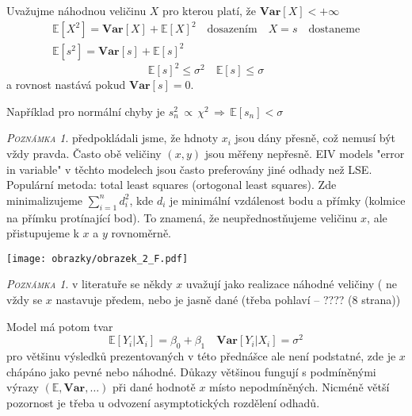 \documentclass[oneside,intlimits,reqno]{scrbook}
\theoremstyle{definition}
\theoremstyle{plain}
\theoremstyle{remark}
\newtheorem{remark}[define]{\textsc{Poznámka}}
\begin{document}
Uvažujme náhodnou veličinu $ X $  pro kterou platí, že $ \textbf{Var} [ X ] < + \infty $
\begin{equation*}
\begin{aligned}
 \mathbb{E}[X^{2}] = \textbf{Var} [ X ] +  \mathbb{E}[X]^{2} \quad \text{dosazením} \quad X = s \quad \text{dostaneme} \\
  \mathbb{E}[s^{2}] = \textbf{Var} [ s ] +  \mathbb{E}[s]^{2}
 \end{aligned} 
\end{equation*}
\begin{equation}
\mathbb{E}[s]^{2} \leq \sigma^{2} \quad \mathbb{E}[s] \leq \sigma
\end{equation}
a rovnost nastává pokud $ \textbf{Var} [ s ] = 0 $.

Například pro normální chyby je $ s_{n}^{2} \, \propto \, \chi^{2} \, \Rightarrow \, \mathbb{E} [s_{n}] < \sigma $

\begin{remark}
	předpokládali jsme, že hdnoty $ x_{i} $ jsou dány přesně, což nemusí být vždy pravda. Často obě veličiny $ (x,y) $ jsou měřeny nepřesně. EIV models "error in variable" v těchto modelech jsou často preferovány jiné odhady než LSE. Populární metoda: total least squares (ortogonal least squares). Zde minimalizujeme $ \sum_{i=1}^{n} d_{i}^{2} $, kde $ d_{i} $ je minimální vzdálenost bodu a přímky (kolmice na přímku protínající bod). To znamená, že neupřednostňujeme veličinu $ x $, ale přistupujeme k $ x $ a $ y $ rovnoměrně.
\end{remark}
\begin{center}
    \texttt{[image: obrazky/obrazek\_2\_F.pdf]}
\end{center}

\begin{remark}
v literatuře se někdy $ x $ uvažují jako realizace náhodné veličiny ( ne vždy se $ x $ nastavuje předem, nebo je jasně dané (třeba pohlaví -- ???? (8 strana)) 
\end{remark}
Model má potom tvar
\begin{equation}
 \mathbb{E}[ Y_{i} \vert X_{i} ] = \beta_{0} + \beta_{1} \quad  \textbf{Var} [ Y_{i} \vert X_{i} ] = \sigma^{2}
\end{equation}
pro většinu výsledků prezentovaných v této přednášce ale není podstatné, zde je $ x $ chápáno jako pevné nebo náhodné.
Důkazy většinou fungují s podmíněnými výrazy $ ( \mathbb{E}, \textbf{Var} , \dots )  $ při dané hodnotě $ x $ místo nepodmíněných.
Nicméně větší pozornost je třeba u odvození asymptotických rozdělení odhadů.
\end{document}

